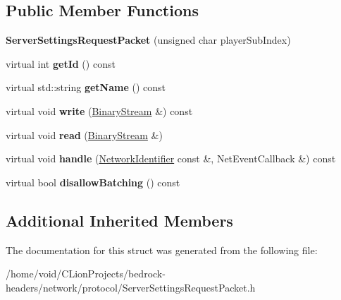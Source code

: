 \subsection*{Public Member Functions}
\begin{DoxyCompactItemize}
\item 
\mbox{\label{struct_server_settings_request_packet_a60077ed6b6043b7ecb8cb554c2652efa}} 
{\bfseries Server\+Settings\+Request\+Packet} (unsigned char player\+Sub\+Index)
\item 
\mbox{\label{struct_server_settings_request_packet_ac66c546cf65c8470af15e295bb101438}} 
virtual int {\bfseries get\+Id} () const
\item 
\mbox{\label{struct_server_settings_request_packet_a25feedfcbad86933ab38194f92955624}} 
virtual std\+::string {\bfseries get\+Name} () const
\item 
\mbox{\label{struct_server_settings_request_packet_a6fd7289301054d2c62642dae7937e04b}} 
virtual void {\bfseries write} (\mbox{\hyperlink{struct_binary_stream}{Binary\+Stream}} \&) const
\item 
\mbox{\label{struct_server_settings_request_packet_ab9c73b71fd4d7890166d6b0b64bef266}} 
virtual void {\bfseries read} (\mbox{\hyperlink{struct_binary_stream}{Binary\+Stream}} \&)
\item 
\mbox{\label{struct_server_settings_request_packet_ac25838877f2441d1c41870d17672a4e8}} 
virtual void {\bfseries handle} (\mbox{\hyperlink{struct_network_identifier}{Network\+Identifier}} const \&, Net\+Event\+Callback \&) const
\item 
\mbox{\label{struct_server_settings_request_packet_abd8bddab1d0fca337b2ba3ebbb88ad50}} 
virtual bool {\bfseries disallow\+Batching} () const
\end{DoxyCompactItemize}
\subsection*{Additional Inherited Members}


The documentation for this struct was generated from the following file\+:\begin{DoxyCompactItemize}
\item 
/home/void/\+C\+Lion\+Projects/bedrock-\/headers/network/protocol/Server\+Settings\+Request\+Packet.\+h\end{DoxyCompactItemize}
